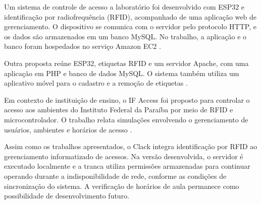 
Um sistema de controle de acesso a laboratório foi desenvolvido com ESP32 e
identificação por radiofrequência (RFID), acompanhado de uma aplicação web de
gerenciamento. O dispositivo se comunica com o servidor pelo protocolo HTTP,
e os dados são armazenados em um banco MySQL. No trabalho, a aplicação e o
banco foram hospedados no serviço Amazon EC2 \cite{goncalves2019rfidweb}.

Outra proposta reúne ESP32, etiquetas RFID e um servidor Apache, com uma
aplicação em PHP e banco de dados MySQL. O sistema também utiliza um aplicativo
móvel para o cadastro e a remoção de etiquetas \cite{costa2020esp32rfid}.

Em contexto de instituição de ensino, o IF Access foi proposto para controlar
o acesso aos ambientes do Instituto Federal da Paraíba por meio de RFID e
microcontrolador. O trabalho relata simulações envolvendo o gerenciamento de
usuários, ambientes e horários de acesso \cite{silva2022ifaccess}.

Assim como os trabalhos apresentados, o Clack integra identificação por RFID
ao gerenciamento informatizado de acessos. Na versão desenvolvida, o servidor
é executado localmente e a tranca utiliza permissões armazenadas para continuar
operando durante a indisponibilidade de rede, conforme as condições de
sincronização do sistema. A verificação de horários de aula permanece como
possibilidade de desenvolvimento futuro.

